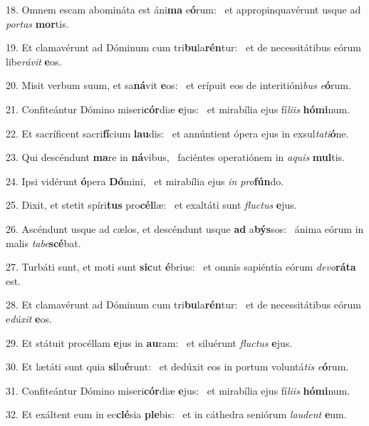 18. Omnem escam abomináta est áni\textbf{ma} e\textbf{ó}rum: \ast\  et appropinquavérunt usque ad \textit{por}\textit{tas} \textbf{mor}tis.\

19. Et clamavérunt ad Dóminum cum tri\textbf{bu}la\textbf{rén}tur: \ast\  et de necessitátibus eórum libe\textit{rá}\textit{vit} \textbf{e}os.\

20. Misit verbum suum, et sa\textbf{ná}vit \textbf{e}os: \ast\  et erípuit eos de interitióni\textit{bus} \textit{e}\textbf{ó}rum.\

21. Confiteántur Dómino miseri\textbf{cór}diæ \textbf{e}jus: \ast\  et mirabília ejus fí\textit{li}\textit{is} \textbf{hó}\textbf{mi}num.\

22. Et sacríficent sacri\textbf{fí}cium \textbf{lau}dis: \ast\  et annúntient ópera ejus in exsul\textit{ta}\textit{ti}\textbf{ó}ne.\

23. Qui descéndunt \textbf{ma}re in \textbf{ná}vibus, \ast\  faciéntes operatiónem in \textit{a}\textit{quis} \textbf{mul}tis.\

24. Ipsi vidérunt \textbf{ó}pera \textbf{Dó}mini, \ast\  et mirabília ejus \textit{in} \textit{pro}\textbf{fún}do.\

25. Dixit, et stetit spíri\textbf{tus} pro\textbf{cél}læ: \ast\  et exaltáti sunt \textit{fluc}\textit{tus} \textbf{e}jus.\

26. Ascéndunt usque ad cælos, et descéndunt usque \textbf{ad} a\textbf{býs}sos: \ast\  ánima eórum in malis \textit{ta}\textit{be}\textbf{scé}bat.\

27. Turbáti sunt, et moti sunt \textbf{sic}ut \textbf{é}brius: \ast\  et omnis sapiéntia eórum \textit{de}\textit{vo}\textbf{rá}\textbf{ta} est.\

28. Et clamavérunt ad Dóminum cum tri\textbf{bu}la\textbf{rén}tur: \ast\  et de necessitátibus eórum e\textit{dú}\textit{xit} \textbf{e}os.\

29. Et státuit procéllam \textbf{e}jus in \textbf{au}ram: \ast\  et siluérunt \textit{fluc}\textit{tus} \textbf{e}jus.\

30. Et lætáti sunt quia \textbf{si}lu\textbf{é}runt: \ast\  et dedúxit eos in portum voluntá\textit{tis} \textit{e}\textbf{ó}rum.\

31. Confiteántur Dómino miseri\textbf{cór}diæ \textbf{e}jus: \ast\  et mirabília ejus fí\textit{li}\textit{is} \textbf{hó}\textbf{mi}num.\

32. Et exáltent eum in ec\textbf{clé}sia \textbf{ple}bis: \ast\  et in cáthedra seniórum \textit{lau}\textit{dent} \textbf{e}um.\

